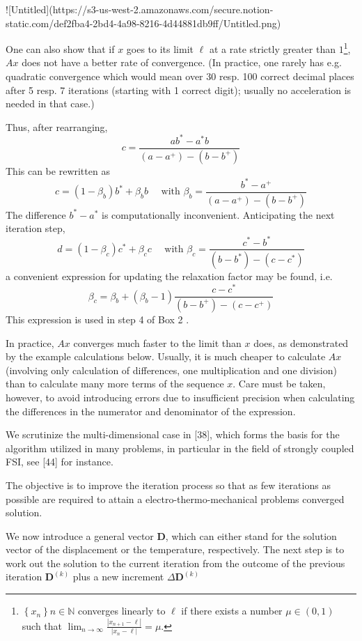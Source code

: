 ![Untitled](https://s3-us-west-2.amazonaws.com/secure.notion-static.com/def2fba4-2bd4-4a98-8216-4d44881db9ff/Untitled.png)

One can also show that if \(x\) goes to its limit \(\ell\) at a rate strictly greater than \(1\)\footnote{$\left\{x_{n}\right\}{n \in \mathbb{N}}$ converges linearly to $\ell$ if there exists a number $\mu \in(0,1)$ such that \(\lim_{n \rightarrow \infty} \frac{\left|x_{n+1}-\ell\right|}{\left|x_{n}-\ell\right|}=\mu\).}, \(A x\) does not have a better rate of convergence.
(In practice, one rarely has e.g. quadratic convergence which would mean over 30 resp. 100 correct decimal places after 5 resp. 7 iterations (starting with 1 correct digit); usually no acceleration is needed in that case.)

Thus, after rearranging,
\[
c=\frac{a b^{*}-a^{*} b}{\left(a-a^{+}\right)-\left(b-b^{+}\right)}
\]
This can be rewritten as
\[
c=\left(1-\beta_{b}\right) b^{*}+\beta_{b} b \quad \text { with } \beta_{b}=\frac{b^{*}-a^{+}}{\left(a-a^{+}\right)-\left(b-b^{+}\right)}
\]
The difference \(b^{*}-a^{*}\) is computationally inconvenient. Anticipating the next iteration step,
\[
d=\left(1-\beta_{c}\right) c^{*}+\beta_{c} c \quad \text { with } \beta_{c}=\frac{c^{*}-b^{*}}{\left(b-b^{*}\right)-\left(c-c^{*}\right)}
\]
a convenient expression for updating the relaxation factor may be found, i.e.
\[
\beta_{c}=\beta_{b}+\left(\beta_{b}-1\right) \frac{c-c^{*}}{\left(b-b^{+}\right)-\left(c-c^{+}\right)}
\]
This expression is used in step 4 of Box 2 .

In practice, \(A x\) converges much faster to the limit than \(x\) does, as demonstrated by the example calculations below. Usually, it is much cheaper to calculate \(A x\) (involving only calculation of differences, one multiplication and one division) than to calculate many more terms of the sequence \(x\). Care must be taken, however, to avoid introducing errors due to insufficient precision when calculating the differences in the numerator and denominator of the expression.

We scrutinize the multi-dimensional case in [38], which forms the basis for the algorithm utilized in many problems, in particular in the field of strongly coupled FSI, see [44] for instance.

The objective is to improve the iteration process so that as few iterations as possible are required to attain a electro-thermo-mechanical problems converged solution.

We now introduce a general vector $\mathbf{D}$, which can either stand for the solution vector of the displacement or the temperature, respectively. The next step is to work out the solution to the current iteration from the outcome of the previous iteration $\mathbf{D}^{(k)}$ plus a new increment $\Delta \mathbf{D}^{(k)}$

